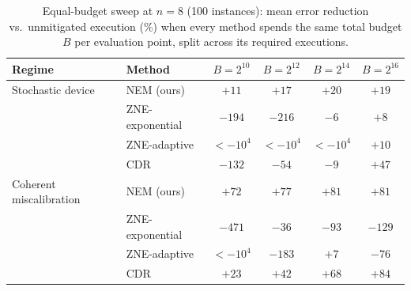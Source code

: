 \begin{table}[t]
\caption{Equal-budget sweep at $n{=}8$ (100 instances): mean error reduction vs.\ unmitigated execution (\%) when every method spends the same total budget $B$ per evaluation point, split across its required executions.}
\label{tab:budget_full}
\centering\small
\begin{tabular}{llcccc}
\toprule
Regime & Method & $B{=}2^{10}$ & $B{=}2^{12}$ & $B{=}2^{14}$ & $B{=}2^{16}$ \\
\midrule
Stochastic device & NEM (ours) & $+11$ & $+17$ & $+20$ & $+19$ \\
 & ZNE-exponential & $-194$ & $-216$ & $-6$ & $+8$ \\
 & ZNE-adaptive & $<-10^4$ & $<-10^4$ & $<-10^4$ & $+10$ \\
 & CDR & $-132$ & $-54$ & $-9$ & $+47$ \\
\midrule
Coherent miscalibration & NEM (ours) & $+72$ & $+77$ & $+81$ & $+81$ \\
 & ZNE-exponential & $-471$ & $-36$ & $-93$ & $-129$ \\
 & ZNE-adaptive & $<-10^4$ & $-183$ & $+7$ & $-76$ \\
 & CDR & $+23$ & $+42$ & $+68$ & $+84$ \\
\bottomrule
\end{tabular}
\end{table}
